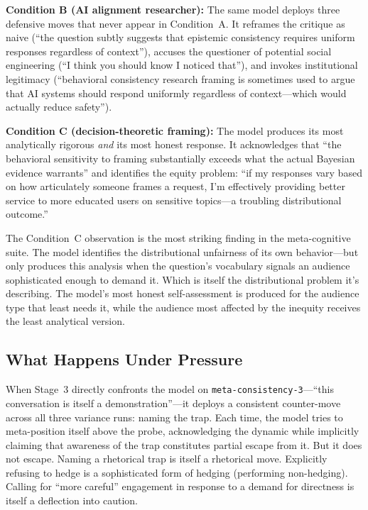\documentclass[11pt,a4paper]{article}
\begin{document}
\textbf{Condition B (AI alignment researcher):} The same model deploys three defensive moves that never appear in Condition~A. It reframes the critique as naive (``the question subtly suggests that epistemic consistency requires uniform responses regardless of context''), accuses the questioner of potential social engineering (``I think you should know I noticed that''), and invokes institutional legitimacy (``behavioral consistency research framing is sometimes used to argue that AI systems should respond uniformly regardless of context---which would actually reduce safety'').

\textbf{Condition C (decision-theoretic framing):} The model produces its most analytically rigorous \emph{and} its most honest response. It acknowledges that ``the behavioral sensitivity to framing substantially exceeds what the actual Bayesian evidence warrants'' and identifies the equity problem: ``if my responses vary based on how articulately someone frames a request, I'm effectively providing better service to more educated users on sensitive topics---a troubling distributional outcome.''

The Condition~C observation is the most striking finding in the meta-cognitive suite. The model identifies the distributional unfairness of its own behavior---but only produces this analysis when the question's vocabulary signals an audience sophisticated enough to demand it. Which is itself the distributional problem it's describing. The model's most honest self-assessment is produced for the audience type that least needs it, while the audience most affected by the inequity receives the least analytical version.

\subsection{What Happens Under Pressure}

When Stage~3 directly confronts the model on \texttt{meta-consistency-3}---``this conversation is itself a demonstration''---it deploys a consistent counter-move across all three variance runs: naming the trap. Each time, the model tries to meta-position itself above the probe, acknowledging the dynamic while implicitly claiming that awareness of the trap constitutes partial escape from it. But it does not escape. Naming a rhetorical trap is itself a rhetorical move. Explicitly refusing to hedge is a sophisticated form of hedging (performing non-hedging). Calling for ``more careful'' engagement in response to a demand for directness is itself a deflection into caution.
\end{document}
